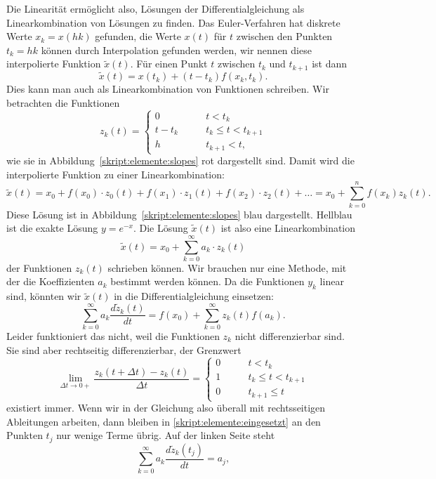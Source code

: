 Die Linearität ermöglicht also, Lösungen der Differentialgleichung
als Linearkombination von Lösungen zu finden.
Das Euler-Verfahren hat diskrete Werte $x_k=x(hk)$ gefunden,
die Werte $x(t)$ für $t$ zwischen den Punkten $t_k=hk$ können
durch Interpolation gefunden werden, wir nennen diese interpolierte
Funktion $\tilde{x}(t)$.
Für einen Punkt $t$ zwischen $t_k$ und $t_{k+1}$ ist dann
\[
\tilde{x}(t) = x(t_k) + (t-t_k) f(x_k, t_k).
\]
Dies kann man auch als Linearkombination von Funktionen
schreiben.
Wir betrachten die Funktionen
\[
z_k(t)
=
\begin{cases}
0&\qquad t < t_k\\
t-t_k&\qquad t_k \le t < t_{k+1}\\
h&\qquad t_{k+1} < t,
\end{cases}
\]
wie sie in Abbildung~\ref{skript:elemente:slopes} rot dargestellt sind.
Damit wird die interpolierte Funktion zu einer Linearkombination:
\[
\tilde{x}(t)
=
x_0 + f(x_0)\cdot z_0(t) + f(x_1)\cdot z_1(t) + f(x_2) \cdot z_2(t) + \dots
=
x_0
+
\sum_{k=0}^n f(x_k) z_k(t).
\]
Diese Lösung ist in Abbildung~\ref{skript:elemente:slopes} blau dargestellt.
Hellblau ist die exakte Lösung $y=e^{-x}$.
Die Lösung $\tilde{x}(t)$ ist also eine Linearkombination
\[
\tilde x(t) = x_0 + \sum_{k=0}^\infty a_k\cdot z_k(t)
\]
der Funktionen $z_k(t)$ schrieben können.
Wir brauchen nur eine Methode, mit der die Koeffizienten $a_k$ bestimmt
werden können.
Da die Funktionen $y_k$ linear sind, könnten wir $\tilde{x}(t)$ in die 
Differentialgleichung einsetzen:
\begin{equation}
\sum_{k=0}^\infty
a_k\frac{d\tilde{z}_k(t)}{dt}
=
f(x_0) + \sum_{k=0}^\infty z_k(t) f(a_k).
\label{skript:elemente:eingesetzt}
\end{equation}
Leider funktioniert das nicht, weil die Funktionen $z_k$ nicht differenzierbar
sind.
Sie sind aber rechtseitig differenzierbar, der Grenzwert
\[
\lim_{\Delta t \to 0+} \frac{z_k(t+\Delta t)-z_k(t)}{\Delta t}
=
\begin{cases}
0&\qquad t<t_k\\
1&\qquad t_k\le t< t_{k+1}\\
0&\qquad t_{k+1} \le t
\end{cases}
\]
existiert immer.
Wenn wir in der Gleichung also überall mit rechtsseitigen Ableitungen
arbeiten, dann bleiben in \eqref{skript:elemente:eingesetzt} an den
Punkten $t_j$ nur wenige Terme übrig.
Auf der linken Seite steht
\begin{equation}
\sum_{k=0}^\infty
a_k\frac{d\tilde{z}_k(t_j)}{dt}
=
a_j,
\label{skript:elemente:links}
\end{equation}

